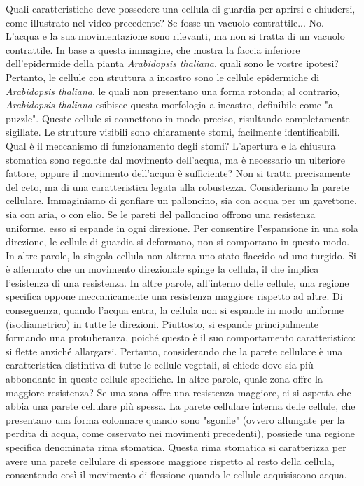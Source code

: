 \documentclass[11pt, a4paper]{article}
\begin{document}
\begin{spacing}{1}
Quali caratteristiche deve possedere una cellula di guardia per aprirsi e chiudersi, come illustrato nel video precedente? Se fosse un vacuolo contrattile... No. L'acqua e la sua movimentazione sono rilevanti, ma non si tratta di un vacuolo contrattile. In base a questa immagine, che mostra la faccia inferiore dell'epidermide della pianta \textit{Arabidopsis thaliana}, quali sono le vostre ipotesi?
Pertanto, le cellule con struttura a incastro sono le cellule epidermiche di \textit{Arabidopsis thaliana}, le quali non presentano una forma rotonda; al contrario, \textit{Arabidopsis thaliana} esibisce questa morfologia a incastro, definibile come "a puzzle". Queste cellule si connettono in modo preciso, risultando completamente sigillate. Le strutture visibili sono chiaramente stomi, facilmente identificabili. Qual è il meccanismo di funzionamento degli stomi? L'apertura e la chiusura stomatica sono regolate dal movimento dell'acqua, ma è necessario un ulteriore fattore, oppure il movimento dell'acqua è sufficiente?
Non si tratta precisamente del ceto, ma di una caratteristica legata alla robustezza. Consideriamo la parete cellulare. Immaginiamo di gonfiare un palloncino, sia con acqua per un gavettone, sia con aria, o con elio. Se le pareti del palloncino offrono una resistenza uniforme, esso si espande in ogni direzione. Per consentire l'espansione in una sola direzione, le cellule di guardia si deformano, non si comportano in questo modo. In altre parole, la singola cellula non alterna uno stato flaccido ad uno turgido.
Si è affermato che un movimento direzionale spinge la cellula, il che implica l'esistenza di una resistenza. In altre parole, all'interno delle cellule, una regione specifica oppone meccanicamente una resistenza maggiore rispetto ad altre. Di conseguenza, quando l'acqua entra, la cellula non si espande in modo uniforme (isodiametrico) in tutte le direzioni. Piuttosto, si espande principalmente formando una protuberanza, poiché questo è il suo comportamento caratteristico: si flette anziché allargarsi. Pertanto, considerando che la parete cellulare è una caratteristica distintiva di tutte le cellule vegetali, si chiede dove sia più abbondante in queste cellule specifiche. In altre parole, quale zona offre la maggiore resistenza? Se una zona offre una resistenza maggiore, ci si aspetta che abbia una parete cellulare più spessa.
La parete cellulare interna delle cellule, che presentano una forma colonnare quando sono "sgonfie" (ovvero allungate per la perdita di acqua, come osservato nei movimenti precedenti), possiede una regione specifica denominata rima stomatica. Questa rima stomatica si caratterizza per avere una parete cellulare di spessore maggiore rispetto al resto della cellula, consentendo così il movimento di flessione quando le cellule acquisiscono acqua.

\end{spacing}
\end{document}
